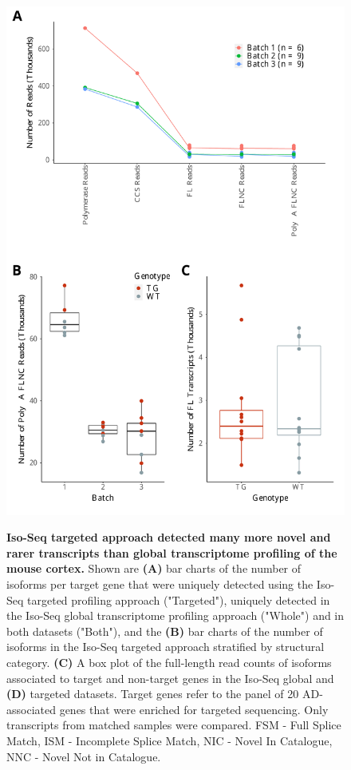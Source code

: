 \begin{figure}[!htp]
	\centering
	\includegraphics[page=3,trim={0 1.5cm 0 0cm},clip,scale = 0.50]{Figures/TargetedTranscriptome.pdf}
	\label{fig:targeted_vs_whole}
	\captionsetup{width=0.95\textwidth}
	\caption[Comparison of Iso-Seq global transcriptome and targeted profiling]%
	{\textbf{Iso-Seq targeted approach detected many more novel and rarer transcripts than global transcriptome profiling of the mouse cortex.} Shown are \textbf{(A)} bar charts of the number of isoforms per target gene that were uniquely detected using the Iso-Seq targeted profiling approach ("Targeted"), uniquely detected in the Iso-Seq global transcriptome profiling approach ("Whole") and in both datasets ("Both"), and the \textbf{(B)} bar charts of the number of isoforms in the Iso-Seq targeted approach stratified by structural category. \textbf{(C)} A box plot of the full-length read counts of isoforms associated to target and non-target genes in the Iso-Seq global and \textbf{(D)} targeted datasets. Target genes refer to the panel of 20 AD-associated genes that were enriched for targeted sequencing. Only transcripts from matched samples were compared. FSM - Full Splice Match, ISM - Incomplete Splice Match, NIC - Novel In Catalogue, NNC - Novel Not in Catalogue.}
\end{figure}

